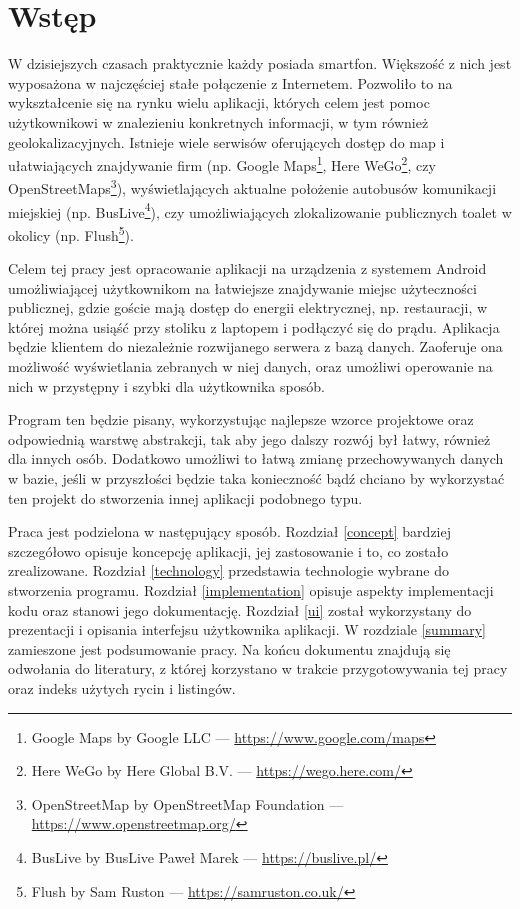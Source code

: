 \documentclass[polish,polish,a4paper,12pt]{article}
\let\sectioncmd\section
\renewcommand{\section}{\clearpage\sectioncmd}
\begin{document}
\tableofcontents

\pagestyle{plain}

\section{Wstęp}

W dzisiejszych czasach praktycznie każdy posiada smartfon. Większość z nich jest wyposażona w najczęściej stałe połączenie z Internetem. Pozwoliło to na wykształcenie się na rynku wielu aplikacji, których celem jest pomoc użytkownikowi w znalezieniu konkretnych informacji, w tym również geolokalizacyjnych. Istnieje wiele serwisów oferujących dostęp do map i ułatwiających znajdywanie firm (np. Google Maps\footnote{Google Maps by Google LLC — \url{https://www.google.com/maps}}, Here WeGo\footnote{Here WeGo by Here Global B.V. — \url{https://wego.here.com/}}, czy OpenStreetMaps\footnote{OpenStreetMap by OpenStreetMap Foundation — \url{https://www.openstreetmap.org/}}), wyświetlających aktualne położenie autobusów komunikacji miejskiej (np. BusLive\footnote{BusLive by BusLive Paweł Marek — \url{https://buslive.pl/}}), czy umożliwiających zlokalizowanie publicznych toalet w okolicy (np. Flush\footnote{Flush by Sam Ruston — \url{https://samruston.co.uk/}}).

Celem tej pracy jest opracowanie aplikacji na urządzenia z systemem Android umożliwiającej użytkownikom na łatwiejsze znajdywanie miejsc użyteczności publicznej, gdzie goście mają dostęp do energii elektrycznej, np. restauracji, w której można usiąść przy stoliku z laptopem i podłączyć się do prądu. Aplikacja będzie klientem do niezależnie rozwijanego serwera z bazą danych. Zaoferuje ona możliwość wyświetlania zebranych w niej danych, oraz umożliwi operowanie na nich w przystępny i szybki dla użytkownika sposób.

Program ten będzie pisany, wykorzystując najlepsze wzorce projektowe oraz odpowiednią warstwę abstrakcji, tak aby jego dalszy rozwój był łatwy, również dla innych osób. Dodatkowo umożliwi to łatwą zmianę przechowywanych danych w bazie, jeśli w przyszłości będzie taka konieczność bądź chciano by wykorzystać ten projekt do stworzenia innej aplikacji podobnego typu.

Praca jest podzielona w następujący sposób. Rozdział \ref{concept} bardziej szczegółowo opisuje koncepcję aplikacji, jej zastosowanie i to, co zostało zrealizowane. Rozdział \ref{technology} przedstawia technologie wybrane do stworzenia programu. Rozdział \ref{implementation} opisuje aspekty implementacji kodu oraz stanowi jego dokumentację. Rozdział \ref{ui} został wykorzystany do prezentacji i opisania interfejsu użytkownika aplikacji. W rozdziale \ref{summary} zamieszone jest podsumowanie pracy. Na końcu dokumentu znajdują się odwołania do literatury, z której korzystano w trakcie przygotowywania tej pracy oraz indeks użytych rycin i listingów.
\end{document}
